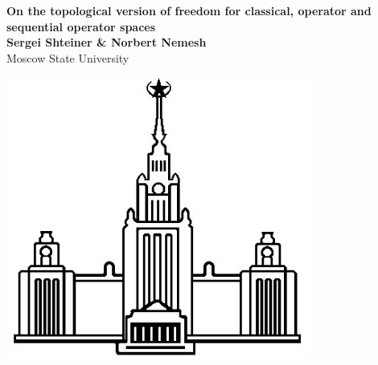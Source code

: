 \documentclass[a0b,landscape]{a0poster}
\begin{document}


\begin{minipage}[b]{0.85\linewidth}
\veryHuge \color{NavyBlue} \textbf{On the topological version of freedom for classical, operator and sequential operator spaces} \color{Black}\\ %
\Large\textbf{Sergei Shteiner \& Norbert Nemesh}\\ %
\Large Moscow State University\\ %
\end{minipage}
%
%
\begin{minipage}[b]{0.15\linewidth}
\begin{center}
\includegraphics[width=10cm]{Eep8BvgUZEk.jpg} %
\end{center}
\end{minipage}


\end{document}
